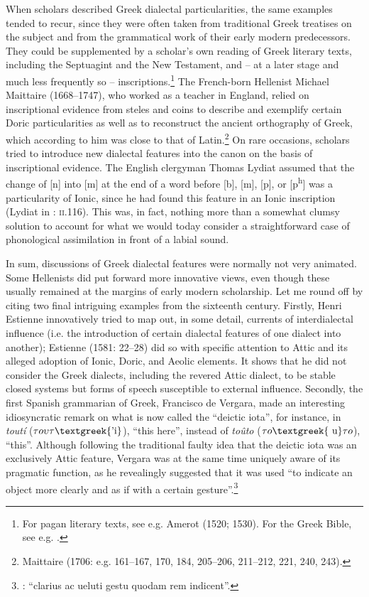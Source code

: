 When scholars described Greek dialectal particularities, the same examples tended to recur, since they were often taken from traditional Greek treatises on the subject and from the grammatical work of their early modern predecessors. They could be supplemented by a scholar’s own reading of Greek literary texts, including the Septuagint and the New Testament, and – at a later stage and much less frequently so – inscriptions.\footnote{For pagan literary texts, see e.g. Amerot (1520; 1530). For the Greek Bible, see e.g. \citet{Pasor1632}.} The French-born Hellenist Michael Maittaire (1668–1747), who worked as a teacher in England, relied on inscriptional evidence from steles and coins to describe and exemplify certain Doric particularities as well as to reconstruct the ancient orthography of Greek, which according to him was close to that of Latin.\footnote{Maittaire (1706: e.g. 161–167, 170, 184, 205–206, 211–212, 221, 240, 243).} On rare occasions, scholars tried to introduce new dialectal features into the canon on the basis of inscriptional evidence. The English clergyman Thomas Lydiat assumed that the change of [n] into [m] at the end of a word before [b], [m], [p], or [p\textsuperscript{h}] was a particularity of Ionic, since he had found this feature in an Ionic inscription (Lydiat in \citealt{Prideaux1676}: \textsc{ii}.116). This was, in fact, nothing more than a somewhat clumsy solution to account for what we would today consider a straightforward case of phonological assimilation in front of a labial sound.

In sum, discussions of Greek dialectal features were normally not very animated. Some Hellenists did put forward more innovative views, even though these usually remained at the margins of early modern scholarship. Let me round off by citing two final intriguing examples from the sixteenth century. Firstly, Henri Estienne innovatively tried to map out, in some detail, currents of interdialectal influence (i.e. the introduction of certain dialectal features of one dialect into another); Estienne (1581: 22–28) did so with specific attention to Attic and its alleged adoption of Ionic, Doric, and Aeolic elements. It shows that he did not consider the Greek dialects, including the revered Attic dialect, to be stable closed systems but forms of speech susceptible to external influence. Secondly, the first Spanish grammarian of Greek, Francisco de Vergara, made an interesting idiosyncratic remark on what is now called the “deictic iota”, for instance, in \textit{toutí} ($\tau o\upsilon \tau \text{\textgreek{'i}}$), “this here”, instead of \textit{toûto} ($\tau o\text{\textgreek{~u}}\tau o$), “this”. Although following the traditional faulty idea that the deictic iota was an exclusively Attic feature, Vergara was at the same time uniquely aware of its pragmatic function, as he revealingly suggested that it was used “to indicate an object more clearly and as if with a certain gesture”.\footnote{\citet[218]{Vergara1537}: “clarius ac ueluti gestu quodam rem indicent”.}

